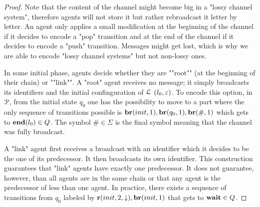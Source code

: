 \begin{proof}
Note that the content of the channel might become big in a "lossy channel system", therefore agents will not store it but rather rebroadcast it letter by letter. An agent only applies a small modification at the beginning of the channel if it decides to encode a "pop" transition and at the end of the channel if it decides to encode a "push" transition. Messages might get lost, which is why we are able to encode "lossy channel systems" but not non-lossy ones.

In some initial phase, agents decide whether they are ""root"" (at the beginning of their chain) or ""link"". A "root" agent receives no message; it simply broadcasts its identifiers and the initial confinguration of $\mathcal{L}$ $(l_0,\varepsilon)$. To encode this option, in $\mathcal{P}$, from the initial state $q_0$ one has the possibility to move to a part where the only sequence of transitions possible is $\br{\mathsf{init}}{1}, \br{\mathsf{q_0}}{1}, \br{\mathsf{\#}}{1}$ which gets to $\mathbf{end}(l_0) \in Q$. The symbol $\mathsf{\#} \in \Sigma$ is the final symbol meaning that the channel was fully broadcast. 
 
A "link" agent first receives a broadcast with an identifier which it decides to be the one of its predecessor. It then broadcasts its own identifier. This construction guarantees that "link" agents have exactly one predecessor. It does not guarantee, however, than all agents are in the same chain or that any agent is the predecessor of less than one agent. In practice, there exists a sequence of transitions from $q_0$ labeled by $\rec{\mathsf{init}}{2}{\enregact}, \br{\mathsf{init}}{1}$ that gets to $\mathbf{wait} \in Q$. 


\end{proof}
